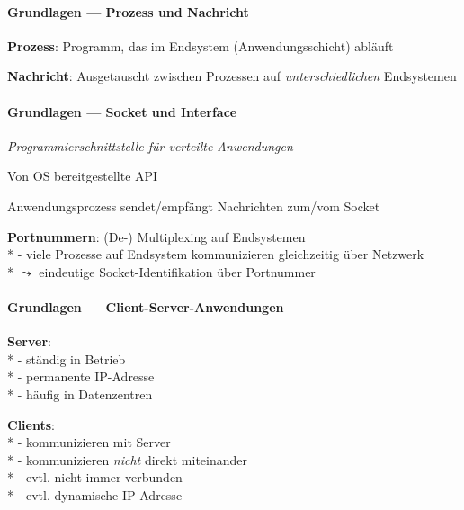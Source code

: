 \paragraph{Grundlagen --- Prozess und Nachricht}
\begin{items}
  \item \textbf{Prozess}: Programm, das im Endsystem (Anwendungsschicht) abläuft
  \item \textbf{Nachricht}: Ausgetauscht zwischen Prozessen auf \emph{unterschiedlichen} Endsystemen
\end{items}

\paragraph{Grundlagen --- Socket und Interface}
\begin{items}
  \item \emph{Programmierschnittstelle für verteilte Anwendungen}
  \item Von OS bereitgestellte API
  \item Anwendungsprozess sendet/empfängt Nachrichten zum/vom Socket
  \item \textbf{Portnummern}: (De-) Multiplexing auf Endsystemen \\*
    - viele Prozesse auf Endsystem kommunizieren gleichzeitig über Netzwerk \\*
    \phantom{-} \( \leadsto \) eindeutige Socket-Identifikation über Portnummer
\end{items}

\paragraph{Grundlagen --- Client-Server-Anwendungen}
\begin{items}
  \item \textbf{Server}: \\*
    - ständig in Betrieb \\*
    - permanente IP-Adresse \\*
    - häufig in Datenzentren
  \item \textbf{Clients}: \\*
    - kommunizieren mit Server \\*
    - kommunizieren \emph{nicht} direkt miteinander \\*
    - evtl. nicht immer verbunden \\*
    - evtl. dynamische IP-Adresse
\end{items}


